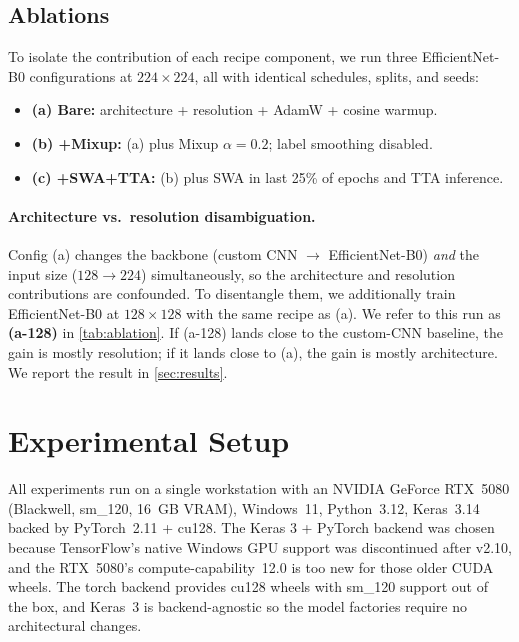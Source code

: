 \documentclass[journal,onecolumn,11pt]{IEEEtran}
\begin{document}
\subsection{Ablations}
To isolate the contribution of each recipe component, we run three
EfficientNet-B0 configurations at $224{\times}224$, all with identical
schedules, splits, and seeds:

\begin{itemize}[leftmargin=*,itemsep=1pt,topsep=1pt]
  \item \textbf{(a) Bare:} architecture + resolution + AdamW + cosine warmup.
  \item \textbf{(b) +Mixup:} (a) plus Mixup $\alpha=0.2$; label smoothing disabled.
  \item \textbf{(c) +SWA+TTA:} (b) plus SWA in last 25\% of epochs and TTA inference.
\end{itemize}

\paragraph{Architecture vs.\ resolution disambiguation.}
Config (a) changes the backbone (custom CNN $\to$ EfficientNet-B0)
\emph{and} the input size ($128 \to 224$) simultaneously, so the
architecture and resolution contributions are confounded. To
disentangle them, we additionally train EfficientNet-B0 at
$128{\times}128$ with the same recipe as (a). We refer to this run as
\textbf{(a-128)} in \cref{tab:ablation}. If (a-128) lands close to the
custom-CNN baseline, the gain is mostly resolution; if it lands close
to (a), the gain is mostly architecture. We report the result in
\cref{sec:results}.

\section{Experimental Setup}
\label{sec:setup}

All experiments run on a single workstation with an NVIDIA GeForce RTX~5080
(Blackwell, sm\_120, 16~GB VRAM), Windows~11, Python~3.12, Keras~3.14
backed by PyTorch~2.11 + cu128. The Keras 3 + PyTorch backend was chosen
because TensorFlow's native Windows GPU support was discontinued after
v2.10, and the RTX~5080's compute-capability~12.0 is too new for those
older CUDA wheels. The torch backend provides cu128 wheels with
sm\_120 support out of the box, and Keras~3 is backend-agnostic so the
model factories require no architectural changes.
\end{document}
